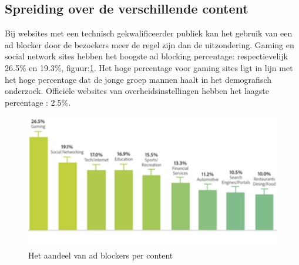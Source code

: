 \documentclass[pdftex,a4paper,12pt,twoside]{report}
\begin{document}
\newpage
\subsection{Spreiding over de verschillende content}
\label{sec Spreiding over de verschillende content}
Bij websites met een technisch gekwalificeerder publiek kan het gebruik van een ad blocker door de bezoekers meer de regel zijn dan de uitzondering. Gaming en social network sites hebben het hoogste ad blocking percentage: respectievelijk 26.5\% en 19.3\%, figuur:\ref{fig: percontent}. Het hoge percentage voor gaming sites ligt in lijn met het hoge percentage dat de jonge groep mannen haalt in het demografisch onderzoek. Officiële websites van overheidsinstellingen hebben het laagste percentage : 2.5\%.

\begin{figure}[h!]
\centering
\includegraphics[width=15cm]{img/percontent}
\caption{Het aandeel van ad blockers per content}
\label{fig: percontent}
\end{figure}
\end{document}
